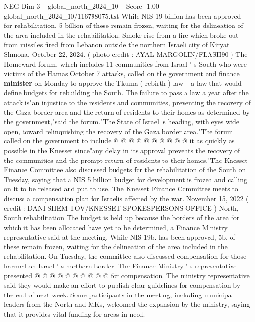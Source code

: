\begin{textsample}{NEG Dim 3 – global\_north\_2024\_10 – Score -1.00 – global\_north\_2024\_10/116798075.txt}  \label{ex:f3_neg_334}
While NIS 19 billion has been approved for rehabilitation, 5 billion of these remain frozen, waiting for the delineation of the area included in the rehabilitation.
Smoke rise from a fire which broke out from missiles fired from Lebanon outside the northern Israeli city of Kiryat Shmona, October 22, 2024. ( photo credit : AYAL MARGOLIN/FLASH90 ) The Homeward forum, which includes 11 communities from Israel ' s South who were victims of the Hamas October 7 attacks, called on the government and finance \textbf{minister} on Monday to approve the Tkuma ( rebirth ) law -- a law that would define budgets for rebuilding the South.
The failure to pass a law a year after the attack is"an injustice to the residents and communities, preventing the recovery of the Gaza border area and the return of residents to their homes as determined by the government,"said the forum."The State of Israel is heading, with eyes wide open, toward relinquishing the recovery of the Gaza border area."The forum called on the government to include @ @ @ @ @ @ @ @ @ @ it as quickly as possible in the Knesset since"any delay in its approval prevents the recovery of the communities and the prompt return of residents to their homes."The Knesset Finance Committee also discussed budgets for the rehabilitation of the South on Tuesday, saying that a NIS 5 billion budget for development is frozen and calling on it to be released and put to use.
The Knesset Finance Committee meets to discuss a compensation plan for Israelis affected by the war.
November 15, 2022 ( credit : DANI SHEM TOV/KNESSET SPOKESPERSONS OFFICE ) North, South rehabilitation The budget is held up because the borders of the area for which it has been allocated have yet to be determined, a Finance Ministry representative said at the meeting.
While NIS 19b. has been approved, 5b. of these remain frozen, waiting for the delineation of the area included in the rehabilitation.
On Tuesday, the committee also discussed compensation for those harmed on Israel ' s northern border.
The Finance Ministry ' s representative presented @ @ @ @ @ @ @ @ @ @ for compensation.
The ministry representative said they would make an effort to publish clear guidelines for compensation by the end of next week.
Some participants in the meeting, including municipal leaders from the North and MKs, welcomed the expansion by the ministry, saying that it provides vital funding for areas in need.

\end{textsample}
